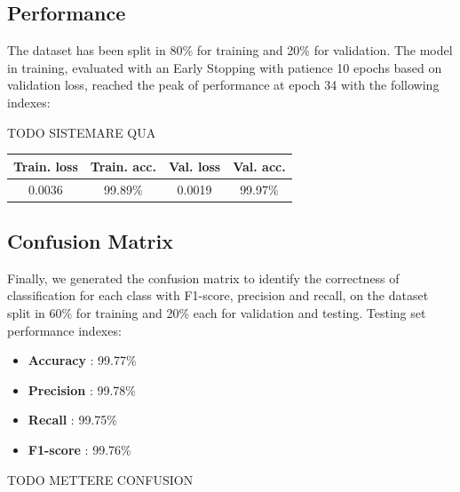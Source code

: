 \documentclass[conference,compsoc,11pt]{IEEEtran}
\begin{document}

\subsection{Performance}
The dataset has been split in 80\% for training and 20\% for validation. The model in training, evaluated with an Early Stopping with patience 10 epochs based on validation loss, reached the peak of performance at epoch 34 with the following indexes:


TODO SISTEMARE QUA
\begin{center}
\begin{tabular}{ c c | c c }
\hline\hline
  \textbf{Train. loss} & \textbf{Train. acc.} & \textbf{Val. loss} & \textbf{Val. acc.}   \\ 
\hline
 0.0036 & 99.89\% & 0.0019 & 99.97\% \\  
\hline\hline
\end{tabular}
\end{center}

\subsection{Confusion Matrix}
Finally, we generated the confusion matrix to identify the correctness of classification for each class with F1-score, precision and recall, on the dataset split in 60\% for training and 20\% each for validation and testing. Testing set performance indexes:

\begin{itemize}
\item \textbf{Accuracy} : 99.77\%
\item \textbf{Precision} : 99.78\%
\item \textbf{Recall} : 99.75\%
\item \textbf{F1-score} : 99.76\%
\end{itemize}

TODO METTERE CONFUSION


\end{document}
